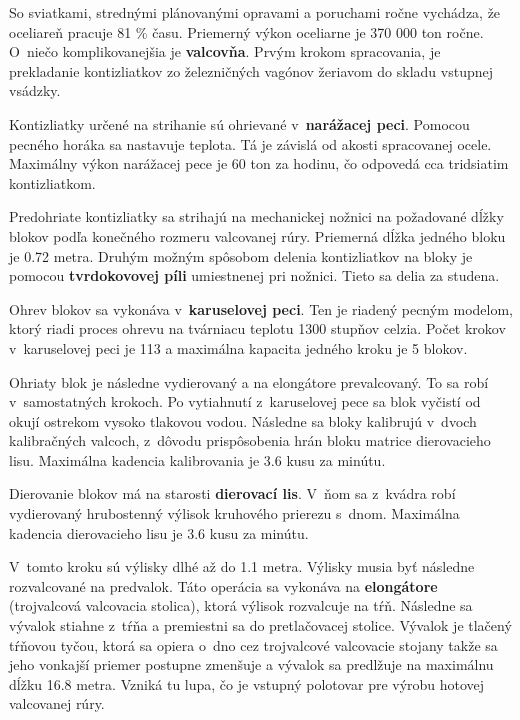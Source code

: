 \documentclass[]{article}
\begin{document}
So sviatkami, strednými plánovanými opravami a poruchami ročne vychádza, že oceliareň pracuje 81 \% času. Priemerný výkon oceliarne je 370 000 ton ročne.\\

O~niečo komplikovanejšia je \textbf{valcovňa}. Prvým krokom spracovania, je prekladanie kontizliatkov zo železničných vagónov žeriavom do skladu vstupnej vsádzky.

Kontizliatky určené na strihanie sú ohrievané v~\textbf{narážacej peci}. Pomocou pecného horáka sa nastavuje teplota. Tá je závislá od akosti spracovanej ocele. Maximálny výkon narážacej pece je 60 ton za hodinu, čo odpovedá cca tridsiatim kontizliatkom.

Predohriate kontizliatky sa strihajú na mechanickej nožnici na požadované dĺžky blokov podľa konečného rozmeru valcovanej rúry. Priemerná dĺžka jedného bloku je 0.72 metra. Druhým možným spôsobom delenia kontizliatkov na bloky je pomocou \textbf{tvrdokovovej píli} umiestnenej pri nožnici. Tieto sa delia za studena.

Ohrev blokov sa vykonáva v~\textbf{karuselovej peci}. Ten je riadený pecným modelom, ktorý riadi proces ohrevu na tvárniacu teplotu 1300 stupňov celzia.  Počet krokov v~karuselovej peci je 113 a maximálna kapacita jedného kroku je 5 blokov.

Ohriaty blok je následne vydierovaný a na elongátore prevalcovaný. To sa robí v~samostatných krokoch. Po vytiahnutí z~karuselovej pece sa blok vyčistí od okují ostrekom vysoko tlakovou vodou. Následne sa bloky kalibrujú v~dvoch kalibračných valcoch, z~dôvodu prispôsobenia hrán bloku matrice dierovacieho lisu. Maximálna kadencia kalibrovania je 3.6 kusu za minútu.

Dierovanie blokov má na starosti \textbf{dierovací lis}. V~ňom sa z~kvádra robí vydierovaný hrubostenný výlisok kruhového prierezu s~dnom. Maximálna kadencia dierovacieho lisu je 3.6 kusu za minútu.

V~tomto kroku sú výlisky dlhé až do 1.1 metra. Výlisky musia byť následne rozvalcované na predvalok. Táto operácia sa vykonáva na \textbf{elongátore} (trojvalcová valcovacia stolica), ktorá výlisok rozvalcuje na tŕň. Následne sa vývalok stiahne z~tŕňa a premiestni sa do pretlačovacej stolice. Vývalok je tlačený tŕňovou tyčou, ktorá sa opiera o~dno cez trojvalcové valcovacie stojany takže sa jeho vonkajší priemer postupne zmenšuje a vývalok sa predlžuje na maximálnu dĺžku 16.8 metra. Vzniká tu lupa, čo je vstupný polotovar pre výrobu hotovej valcovanej rúry.
\end{document}
